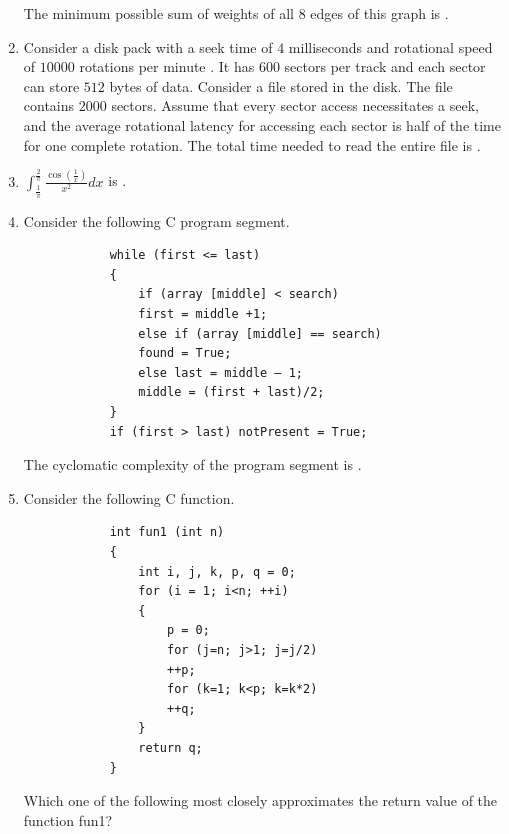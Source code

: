 \documentclass[journal,12pt,onecolumn]{IEEEtran}
\theoremstyle{remark}
\begin{document}
\begin{enumerate}[resume]
		
		The minimum possible sum of weights of all $8$ edges of this graph is \underline{\hspace{2cm}}.
		
		\hfill{}
		
		\item Consider a disk pack with a seek time of $4$ milliseconds and rotational speed of $10000$ rotations per minute . It has $600$ sectors per track and each sector can store $512$ bytes of data. Consider a file stored in the disk. The file contains $2000$ sectors. Assume that every sector access necessitates a seek, and the average rotational latency for accessing each sector is half of the time for one complete rotation. The total time  needed to read the entire file is \underline{\hspace{2cm}}.
		
		\hfill{}
		
		\item $\int_{\frac{1}{\pi}}^{\frac{2}{\pi}} \frac{\cos(\frac{1}{x})}{x^2} dx$ is \underline{\hspace{2cm}}.
		
		\hfill{}
		
		\item Consider the following C program segment.
		
		\begin{verbatim}
			while (first <= last)
			{
				if (array [middle] < search)
				first = middle +1;
				else if (array [middle] == search)
				found = True;
				else last = middle – 1;
				middle = (first + last)/2;
			}
			if (first > last) notPresent = True;
		\end{verbatim}
		
		The cyclomatic complexity of the program segment is \underline{\hspace{2cm}}.
		
		\hfill{}
		
		\item Consider the following C function.
		
		\begin{verbatim}
			int fun1 (int n)
			{
				int i, j, k, p, q = 0;
				for (i = 1; i<n; ++i)
				{
					p = 0;
					for (j=n; j>1; j=j/2)
					++p;
					for (k=1; k<p; k=k*2)
					++q;
				}
				return q;
			}
		\end{verbatim}
		
		Which one of the following most closely approximates the return value of the function fun1?
		

\end{enumerate}
\end{document}
